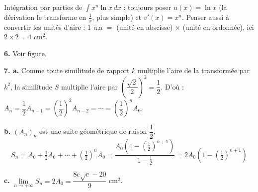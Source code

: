 \documentclass[11pt]{article}
\begin{document}
\begin{methode}
Intégration par parties de $\int x^n\ln x\,dx$ : toujours poser
$u(x) = \ln x$ (la dérivation le transforme en $\frac{1}{x}$, plus
simple) et $v'(x) = x^n$. Penser aussi à convertir les unités d'aire :
1 u.a $=$ (unité en abscisse) $\times$ (unité en ordonnée), ici
$2 \times 2 = 4$ cm$^2$.
\end{methode}

\textbf{6.} Voir figure.

\textbf{7. a.} Comme toute similitude de rapport $k$ multiplie l'aire de la transformée par $k^2$, la similitude $S$ multiplie l'aire par $\left(\dfrac{\sqrt{2}}{2}\right)^2 = \dfrac{1}{2}$. D'où : $A_n = \dfrac{1}{2}A_{n-1} = \left(\dfrac{1}{2}\right)^2 A_{n-2} = \cdots = \left(\dfrac{1}{2}\right)^n A_0$.

\textbf{b.} $(A_n)_n$ est une suite géométrique de raison $\dfrac{1}{2}$.
\[ S_n = A_0 + \tfrac{1}{2}A_0 + \cdots + \left(\tfrac{1}{2}\right)^n A_0 = \frac{A_0\left(1 - (\tfrac{1}{2})^{n+1}\right)}{1 - \tfrac{1}{2}} = 2A_0\left(1 - (\tfrac{1}{2})^{n+1}\right) \]

\textbf{c.} $\lim\limits_{n\to+\infty} S_n = 2A_0 = \dfrac{8e\sqrt{e} - 20}{9}$ cm$^2$.
\end{document}
